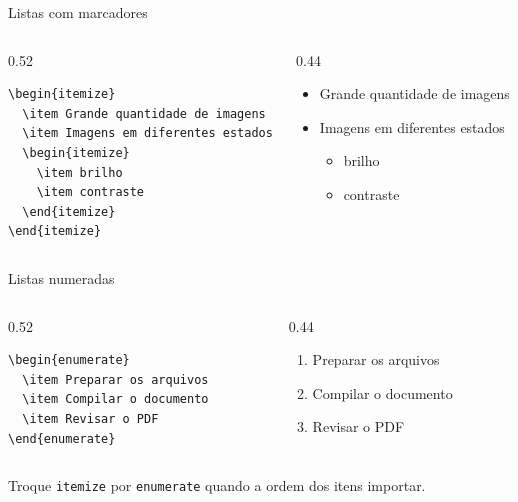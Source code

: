 \begin{frame}[fragile]{Listas com marcadores}
\begin{columns}[T]
\begin{column}{0.52\textwidth}
\begin{lstlisting}
\begin{itemize}
  \item Grande quantidade de imagens
  \item Imagens em diferentes estados
  \begin{itemize}
    \item brilho
    \item contraste
  \end{itemize}
\end{itemize}
\end{lstlisting}
\end{column}
\begin{column}{0.44\textwidth}
\begin{itemize}
  \item Grande quantidade de imagens
  \item Imagens em diferentes estados
  \begin{itemize}
    \item brilho
    \item contraste
  \end{itemize}
\end{itemize}
\end{column}
\end{columns}
\end{frame}

\begin{frame}[fragile]{Listas numeradas}
\begin{columns}[T]
\begin{column}{0.52\textwidth}
\begin{lstlisting}
\begin{enumerate}
  \item Preparar os arquivos
  \item Compilar o documento
  \item Revisar o PDF
\end{enumerate}
\end{lstlisting}
\end{column}
\begin{column}{0.44\textwidth}
\begin{enumerate}
  \item Preparar os arquivos
  \item Compilar o documento
  \item Revisar o PDF
\end{enumerate}
\end{column}
\end{columns}

Troque \verb|itemize| por \verb|enumerate| quando a ordem dos itens importar.
\end{frame}
